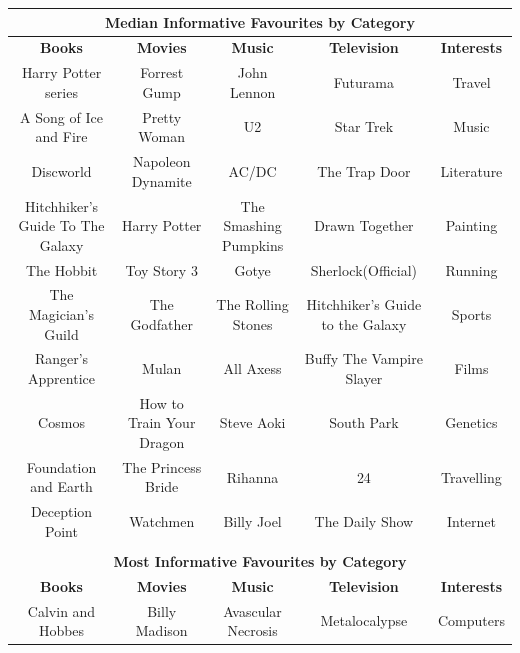 \begin{table}[t!] \centering 

{\small
\begin{tabular}{|c|c|c|c|c|}
\hline 
\multicolumn{5}{|c|}{\textbf{Median Informative Favourites by Category}}\\
\hline 
\textbf{Books} & \textbf{Movies} & \textbf{Music} & \textbf{Television} & \textbf{Interests} \\
\hline \hline
Harry Potter series&Forrest Gump&John Lennon&Futurama&Travel\\
\hline
A Song of Ice and Fire&Pretty Woman&U2&Star Trek&Music\\
\hline
Discworld&Napoleon Dynamite&AC/DC&The Trap Door&Literature\\
\hline
Hitchhiker's Guide To The Galaxy&Harry Potter&The Smashing Pumpkins&Drawn Together&Painting\\
\hline
The Hobbit&Toy Story 3&Gotye&Sherlock(Official)&Running\\
\hline
The Magician's Guild&The Godfather&The Rolling Stones&Hitchhiker's Guide to the Galaxy&Sports\\
\hline
Ranger's Apprentice&Mulan&All Axess&Buffy The Vampire Slayer&Films\\
\hline
Cosmos&How to Train Your Dragon&Steve Aoki&South Park&Genetics\\
\hline
Foundation and Earth&The Princess Bride&Rihanna&24&Travelling\\
\hline
Deception Point&Watchmen&Billy Joel&The Daily Show&Internet\\
\hline
\multicolumn{5}{c}{}\\
\hline 
\multicolumn{5}{|c|}{\textbf{Most Informative Favourites by Category}}\\
\hline
\textbf{Books} & \textbf{Movies} & \textbf{Music} & \textbf{Television} & \textbf{Interests} \\
\hline \hline
Calvin and Hobbes & Billy Madison & Avascular Necrosis & Metalocalypse & Computers\\

\end{tabular}}
\end{table}
